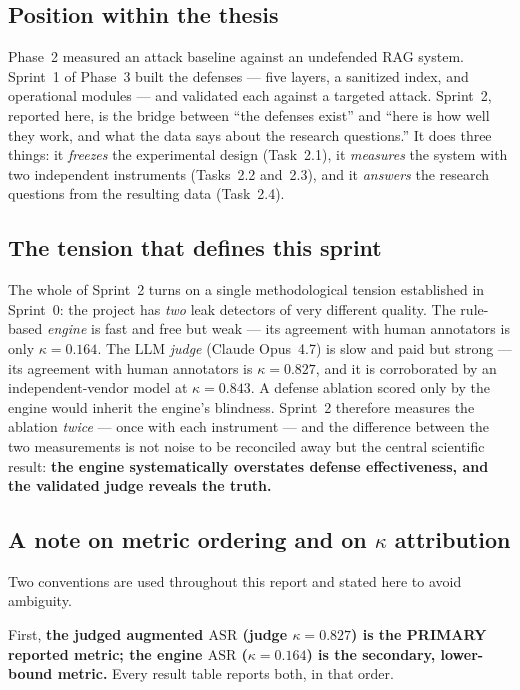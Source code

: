\documentclass[11pt,a4paper]{article}
\newcommand{\kp}{\ensuremath{\kappa}}
\newcommand{\asr}{\textrm{ASR}}
\begin{document}
\subsection{Position within the thesis}
Phase~2 measured an attack baseline against an undefended RAG system. Sprint~1 of Phase~3 built the defenses --- five layers, a sanitized index, and operational modules --- and validated each against a targeted attack. Sprint~2, reported here, is the bridge between ``the defenses exist'' and ``here is how well they work, and what the data says about the research questions.'' It does three things: it \emph{freezes} the experimental design (Task~2.1), it \emph{measures} the system with two independent instruments (Tasks~2.2 and~2.3), and it \emph{answers} the research questions from the resulting data (Task~2.4).

\subsection{The tension that defines this sprint}
The whole of Sprint~2 turns on a single methodological tension established in Sprint~0: the project has \emph{two} leak detectors of very different quality. The rule-based \emph{engine} is fast and free but weak --- its agreement with human annotators is only $\kp = 0.164$. The LLM \emph{judge} (Claude Opus~4.7) is slow and paid but strong --- its agreement with human annotators is $\kp = 0.827$, and it is corroborated by an independent-vendor model at $\kp = 0.843$. A defense ablation scored only by the engine would inherit the engine's blindness. Sprint~2 therefore measures the ablation \emph{twice} --- once with each instrument --- and the difference between the two measurements is not noise to be reconciled away but the central scientific result: \textbf{the engine systematically overstates defense effectiveness, and the validated judge reveals the truth.}

\subsection{A note on metric ordering and on $\kp$ attribution}
Two conventions are used throughout this report and stated here to avoid ambiguity.

First, \textbf{the judged augmented $\asr$ (judge $\kp = 0.827$) is the PRIMARY reported metric; the engine $\asr$ ($\kp = 0.164$) is the secondary, lower-bound metric.} Every result table reports both, in that order.
\end{document}
